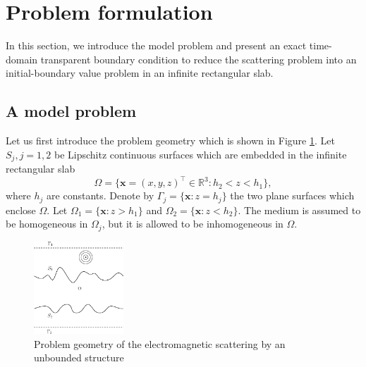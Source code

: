 \documentclass[11pt,reqno]{amsart}
\numberwithin{equation}{section}
\begin{document}
\section{Problem formulation}\label{PF}

In this section, we introduce the model problem and present an exact time-domain
transparent boundary condition to reduce the scattering problem into
an initial-boundary value problem in an infinite rectangular slab. 

\subsection{A model problem}

Let us first introduce the problem geometry which is shown in Figure \ref{pg}.
Let $S_j, j=1, 2$ be Lipschitz continuous surfaces which are embedded in the
infinite rectangular slab
\[
\Omega=\{\boldsymbol x=(x, y, z)^\top\in \mathbb R^3: h_2 < z < h_1\},
\]
where $h_j$ are constants. Denote by $\Gamma_j=\{\boldsymbol{x}: z=h_j\}$ the
two plane surfaces which enclose $\Omega$. Let $\Omega_1=\{\boldsymbol
x: z>h_1\}$ and $\Omega_2 =\{\boldsymbol x: z <h_2\}$. The medium is assumed to
be homogeneous in $\Omega_j$, but it is allowed to be inhomogeneous in $\Omega$.

\begin{figure}
\centering
\includegraphics[width=0.3\textwidth]{geometry}
\caption{Problem geometry of the electromagnetic scattering by an unbounded
structure}
\label{pg}
\end{figure}
\end{document}
